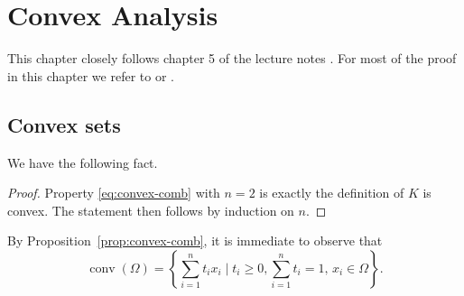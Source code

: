 \chapter{Convex Analysis}
 
 This chapter closely follows chapter 5 of the lecture notes \cite{fornasierFoundations}.
 For most of the proof in this chapter we refer to \cite{boydConvex2023} or \cite{rockafellarConvex2015}.
 
 \section{Convex sets}
 
 
 We have the following fact.
 
 
 \begin{proof}
     Property \eqref{eq:convex-comb} with $n=2$ is exactly the definition of $K$ is convex. The statement then follows by induction on $n$.
 \end{proof}
 
 
 By Proposition~\ref{prop:convex-comb}, it is immediate to observe that
 \begin{equation}
     \operatorname{conv}(\Omega) = \left\{ \sum_{i=1}^n t_i x_i \mid t_i\ge 0, \sum_{i=1}^n t_i = 1,\, x_i \in \Omega \right\}.
 \end{equation}
 
 

